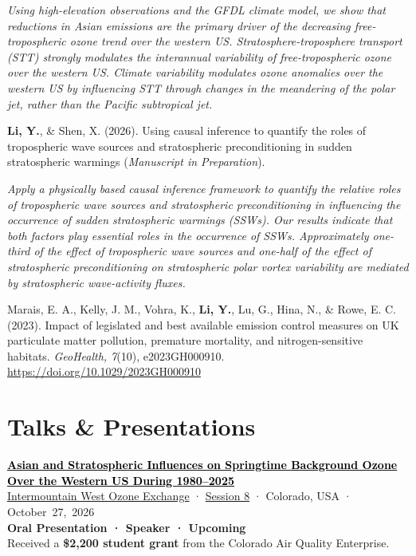 \documentclass[11pt,a4paper]{article}
\newcommand{\publication}[1]{%
  \Needspace{4\baselineskip}
  \par\noindent #1\par
}
\newcommand{\researchsummary}[1]{%
  {\itshape #1\par}\vspace{4pt}
}
\begin{document}
\researchsummary{Using high-elevation observations and the GFDL climate model, we show that reductions in Asian emissions are the primary driver of the decreasing free-tropospheric ozone trend over the western US. Stratosphere-troposphere transport (STT) strongly modulates the interannual variability of free-tropospheric ozone over the western US. Climate variability modulates ozone anomalies over the western US by influencing STT through changes in the meandering of the polar jet, rather than the Pacific subtropical jet.}

\publication{\textbf{Li, Y.}, \& Shen, X. (2026). Using causal inference to quantify the roles of tropospheric wave sources and stratospheric preconditioning in sudden stratospheric warmings (\textit{Manuscript in Preparation}).}

\researchsummary{Apply a physically based causal inference framework to quantify the relative roles of tropospheric wave sources and stratospheric preconditioning in influencing the occurrence of sudden stratospheric warmings (SSWs). Our results indicate that both factors play essential roles in the occurrence of SSWs. Approximately one-third of the effect of tropospheric wave sources and one-half of the effect of stratospheric preconditioning on stratospheric polar vortex variability are mediated by stratospheric wave-activity fluxes.}

\publication{Marais, E. A., Kelly, J. M., Vohra, K., \textbf{Li, Y.}, Lu, G., Hina, N., \& Rowe, E. C. (2023). Impact of legislated and best available emission control measures on UK particulate matter pollution, premature mortality, and nitrogen-sensitive habitats. \textit{GeoHealth, 7}(10), e2023GH000910. \url{https://doi.org/10.1029/2023GH000910}}

\newpage

\section*{Talks \& Presentations}

\publication{\href{https://ozoneexchange.org/conference-details/program/}{\textcolor{black}{\textbf{Asian and Stratospheric Influences on Springtime Background Ozone Over the Western US During \mbox{1980--2025}}}}\\
  \href{https://ozoneexchange.org/}{Intermountain West Ozone Exchange} · \href{https://ozoneexchange.org/conference-details/program/}{Session 8} · Colorado, USA · October~27,~2026\\
  \textbf{Oral Presentation · Speaker · Upcoming}\\
  Received a \textbf{\$2,200 student grant} from the Colorado Air Quality Enterprise.}
\end{document}
